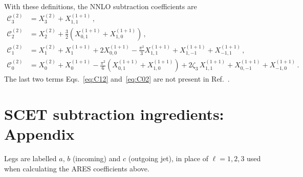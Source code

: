 With these definitions, the NNLO subtraction coefficients are
\begin{subequations}
\label{eq:NNLO-Cn}
\begin{align}
    \mathcal{C}_3^{(2)} &= X_3^{(2)} + X_{1,1}^{(1+1)}\,, 
    \label{eq:C32}\\
    \mathcal{C}_2^{(2)} &= X_2^{(2)} + \frac{3}{2}\!\left(
        X_{0,1}^{(1+1)} + X_{1,0}^{(1+1)}\right)\,,
    \label{eq:C22}\\
    \mathcal{C}_1^{(2)} &= X_1^{(2)} + X_1^{(1+1)} + 2X_{0,0}^{(1+1)}
        - \frac{\pi^2}{3}X_{1,1}^{(1+1)}+X_{1,-1}^{(1+1)}+X_{-1,1}^{(1+1)}\,,
    \label{eq:C12}\\
    \mathcal{C}_0^{(2)} &= X_0^{(2)} + X_0^{(1+1)}
        - \frac{\pi^2}{6}\!\left(X_{0,1}^{(1+1)}+X_{1,0}^{(1+1)}\right)
        + 2\zeta_3\,X_{1,1}^{(1+1)}+X_{0,-1}^{(1+1)}+X_{-1,0}^{(1+1)}\,.
    \label{eq:C02}
\end{align}
\end{subequations}
The last two terms Eqs.~\eqref{eq:C12} and~\eqref{eq:C02} are not present in Ref.~\cite{Gaunt:2015pea}.

\section{SCET subtraction ingredients: Appendix}
\label{ap:N-jet-ing}
 Legs are labelled $a$, $b$ (incoming) and
$c$ (outgoing jet), in place of $\ell=1,2,3$ used
when calculating the \textsc{ARES} coefficients above.

